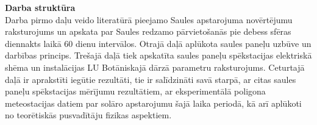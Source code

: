 \textbf{Darba struktūra}\\
Darba pirmo daļu veido literatūrā pieejamo Saules apstarojuma novērtējumu raksturojums un apskata par Saules redzamo pārvietošanās pie debess sfēras diennakts laikā 60 dienu intervālos. Otrajā daļā aplūkota saules paneļu uzbūve un darbības princips. Trešajā daļā tiek apskatīta saules paneļu spēkstacijas elektriskā shēma un instalācijas LU Botāniskajā dārzā parametru raksturojums.
Ceturtajā daļā ir aprakstīti iegūtie rezultāti, tie ir salīdzināti savā starpā, ar citas saules paneļu spēkstacijas mērījumu rezultātiem, ar eksperimentālā poligona meteostacijas datiem par solāro apstarojumu šajā laika periodā, kā arī aplūkoti no teorētiskās pusvadītāju fizikas aspektiem.



